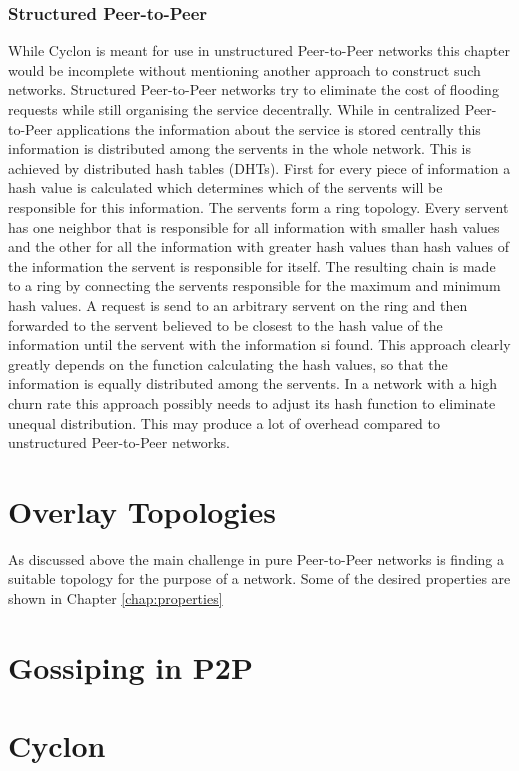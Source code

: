 \subsubsection{Structured Peer-to-Peer}
While Cyclon is meant for use in unstructured Peer-to-Peer networks this chapter
would be incomplete without mentioning another approach to construct such
networks. Structured Peer-to-Peer networks try to eliminate the cost of
flooding requests while still organising the service decentrally. While in
centralized Peer-to-Peer applications the information about the service is
stored centrally this information is distributed among the servents in the whole
network. This is achieved by distributed hash tables (DHTs). First for every
piece of information a hash value is calculated which determines which of the
servents will be responsible for this information. The servents form a ring
topology. Every servent has one neighbor that is responsible for all
information with smaller hash values and the other for all the information with greater hash
values than hash values of the information the servent is responsible for
itself. The resulting chain is made to a ring by connecting the servents
responsible for the maximum and minimum hash values. A request is send to an
arbitrary servent on the ring and then forwarded to the servent believed to be
closest to the hash value of the information until the servent with the
information si found. This approach clearly greatly depends on the function
calculating the hash values, so that the information is equally distributed
among the servents. In a network with a high churn rate this approach possibly
needs to adjust its hash function to eliminate unequal distribution. This may
produce a lot of overhead compared to unstructured Peer-to-Peer networks.


\section{Overlay Topologies}
As discussed above the main challenge in pure Peer-to-Peer networks is finding a
suitable topology for the purpose of a network. Some of the desired 
properties are shown in Chapter \ref{chap:properties} 

\section{Gossiping in P2P}

\section{Cyclon} 
